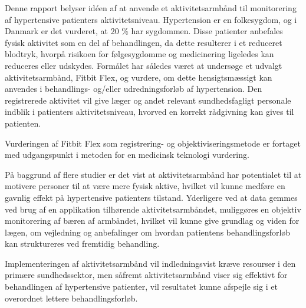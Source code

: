 Denne rapport belyser idéen af at anvende et aktivitetsarmbånd til monitorering af hypertensive patienters aktivitetsniveau. 
Hypertension er en folkesygdom, og i Danmark er det vurderet, at 20 \% har sygdommen. Disse patienter anbefales fysisk aktivitet som en del af behandlingen, da dette resulterer i et reduceret blodtryk, hvorpå risikoen for følgesygdomme og medicinering ligeledes kan reduceres eller udskydes. 
Formålet har således været at undersøge et udvalgt aktivitetsarmbånd, Fitbit Flex, og vurdere, om dette hensigtsmæssigt kan anvendes i behandlings- og/eller udredningsforløb af hypertension. 
Den registrerede aktivitet vil give læger og andet relevant sundhedsfagligt personale indblik i patienters aktivitetsniveau, hvorved en korrekt rådgivning kan gives til patienten. 

Vurderingen af Fitbit Flex som registrering- og objektiviseringsmetode er fortaget med udgangspunkt i metoden for en medicinsk teknologi vurdering.  

På baggrund af flere studier er det vist at aktivitetsarmbånd har potentialet til at motivere personer til at være mere fysisk aktive, hvilket vil kunne medføre en gavnlig effekt på hypertensive patienters tilstand. Yderligere ved at data gemmes ved brug af en applikation tilhørende aktivitetsarmbåndet, muliggøres en objektiv monitorering af bæren af armbåndet, hvilket vil kunne give grundlag og viden for lægen, om vejledning og anbefalinger om hvordan patientens behandlingsforløb kan struktureres ved fremtidig behandling.

Implementeringen af aktivitetsarmbånd vil indledningsvist kræve resourser i den primære sundhedssektor, men såfremt aktivitetsarmbånd viser sig effektivt for behandlingen af hypertensive patienter, vil resultatet kunne afspejle sig i et overordnet lettere behandlingsforløb. 